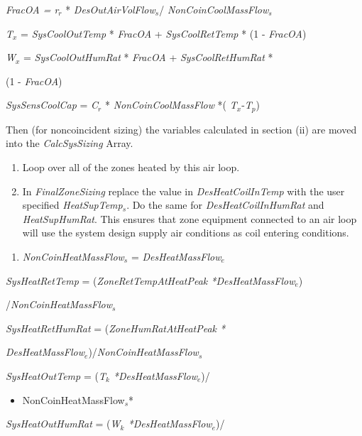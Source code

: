 \emph{FracOA = r\(_{r}\)} * \emph{DesOutAirVolFlow\(_{s}\)}/ \emph{NonCoinCoolMassFlow\(_{s}\)}

\emph{T\(_{x}\)} = \emph{SysCoolOutTemp} * \emph{FracOA} + \emph{SysCoolRetTemp} * (1 - \emph{FracOA})

\emph{W\(_{x}\)} = \emph{SysCoolOutHumRat} * \emph{FracOA} + \emph{SysCoolRetHumRat} *

(1 - \emph{FracOA})

\emph{SysSensCoolCap} = \emph{C\(_{r}\)} * \emph{NonCoinCoolMassFlow} *( \emph{T\(_{x}\)}-\emph{T\(_{p}\)})

Then (for noncoincident sizing) the variables calculated in section (ii) are moved into the \emph{CalcSysSizing} Array.

\begin{enumerate}
\def\labelenumi{(\alph{enumi})}
\setcounter{enumi}{2}
\item
  Loop over all of the zones heated by this air loop.
\item
  In \emph{FinalZoneSizing} replace the value in \emph{DesHeatCoilInTemp} with the user specified \emph{HeatSupTemp\(_{s}\)}. Do the same for \emph{DesHeatCoilInHumRat} and \emph{HeatSupHumRat}. This ensures that zone equipment connected to an air loop will use the system design supply air conditions as coil entering conditions. 
\end{enumerate}

\begin{enumerate}
\def\labelenumi{(\roman{enumi})}
\setcounter{enumi}{1}
\tightlist
\item
  \emph{NonCoinHeatMassFlow\(_{s}\)} = \emph{DesHeatMassFlow\(_{e}\)}
\end{enumerate}

\emph{SysHeatRetTemp} = (\emph{ZoneRetTempAtHeatPeak *DesHeatMassFlow\(_{e}\)})

/\emph{NonCoinHeatMassFlow\(_{s}\)}

\emph{SysHeatRetHumRat} = (\emph{ZoneHumRatAtHeatPeak *}

\emph{DesHeatMassFlow\(_{e}\)})/\emph{NonCoinHeatMassFlow\(_{s}\)}

\emph{SysHeatOutTemp} = (\emph{T\(_{k}\) *DesHeatMassFlow\(_{e}\)})/

\begin{itemize}
\tightlist
\item
  NonCoinHeatMassFlow\(_{s}\)*
\end{itemize}

\emph{SysHeatOutHumRat} = (\emph{W\(_{k}\) *DesHeatMassFlow\(_{e}\)})/

